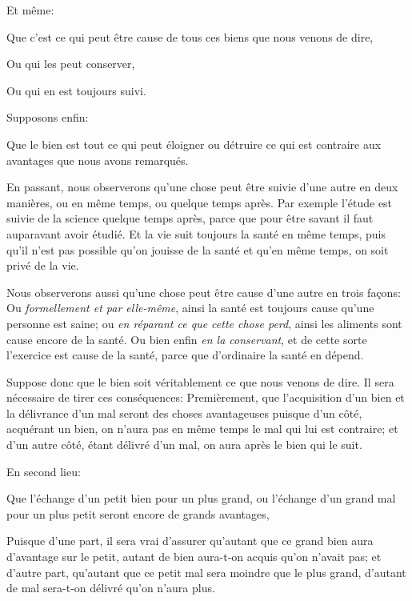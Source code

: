 Et même:

\begin{emphpar}
     Que c'est ce qui peut être cause de tous ces biens que nous venons de dire,

	 Ou qui les peut conserver,

	 Ou qui en est toujours suivi.
\end{emphpar}

\bigbreak

Supposons enfin:

\begin{emphpar}
     Que le bien est tout ce qui peut éloigner ou détruire ce qui est contraire aux avantages que nous avons remarqués.
\end{emphpar}

En passant, nous observerons qu'une chose peut être suivie d'une autre en deux manières, ou en même temps, ou quelque temps
après. Par exemple l'étude est suivie de la science quelque temps après, parce que pour être savant il faut auparavant
avoir étudié. Et la vie suit toujours la santé en même temps, puis qu'il n'est pas possible qu'on jouisse de la santé et
qu'en même temps, on soit privé de la vie.

Nous observerons aussi qu'une chose peut être cause d'une autre en trois façons: Ou \emph{formellement et par elle-même},
ainsi la santé est toujours cause qu'une personne est saine; ou \emph{en réparant ce que cette chose perd}, ainsi les
aliments sont cause encore de la santé. Ou bien enfin \emph{en la conservant}, et de cette sorte l'exercice est cause de
la santé, parce que d'ordinaire la santé en dépend.

\bigbreak

Suppose donc que le bien soit véritablement ce que nous venons de dire. Il sera nécessaire de tirer ces conséquences:
Premièrement, que l'acquisition d'un bien et la délivrance d'un mal seront des choses avantageuses puisque d'un côté,
acquérant un bien, on n'aura pas en même temps le mal qui lui est contraire; et d'un autre côté, étant délivré d'un
mal, on aura après le bien qui le suit. 

\bigbreak

En second lieu:

\begin{emphpar}
     Que l'échange d'un petit bien pour un plus grand, ou l'échange d'un grand mal pour un plus petit seront encore de
	 grands avantages,
\end{emphpar}

Puisque d'une part, il sera vrai d'assurer qu'autant que ce grand bien aura d'avantage sur le petit, autant de bien
aura-t-on acquis qu'on n'avait pas; et d'autre part, qu'autant que ce petit mal sera moindre que le plus grand,
d'autant de mal sera-t-on délivré qu'on n'aura plus.

